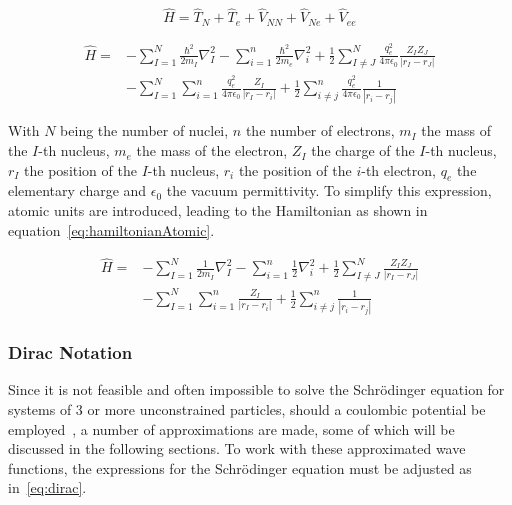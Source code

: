 \documentclass[11pt]{article}
\begin{document}
\begin{equation}
  \hat{H} = \hat{T}_N + \hat{T}_e + \hat{V}_{NN} + \hat{V}_{Ne} + \hat{V}_{ee}
  \label{eq:hamiltonian3}
\end{equation}

\begin{equation}
  \begin{aligned}
    \hat{H} = & -\sum_{I=1}^{N}\frac{\hbar^2}{2m_I}\nabla_I^2 -\sum_{i=1}^{n}\frac{\hbar^2}{2m_e}\nabla_i^2 + \frac{1}{2} \sum_{I\neq J}^{N} \frac{q_{e}^2}{4\pi \epsilon_0}\frac{Z_I Z_J}{|r_I - r_J|} \\
    & - \sum_{I=1}^{N}\sum_{i=1}^{n}\frac{q_{e}^2}{4\pi \epsilon_0}\frac{Z_I}{|r_I - r_i|} + \frac{1}{2}\sum_{i\neq j}^{n}\frac{q_{e}^2}{4\pi \epsilon_0}\frac{1}{|r_i - r_j|}
  \end{aligned}
  \label{eq:hamiltonian2}
\end{equation}

\bigskip

\noindent With $N$ being the number of nuclei, $n$ the number of electrons, $m_I$ the mass of the $I$-th nucleus, $m_e$ the mass of the electron, $Z_I$ the charge of the $I$-th nucleus, $r_I$ the position of the $I$-th nucleus, $r_i$ the position of the $i$-th electron, $q_e$ the elementary charge and $\epsilon_0$ the vacuum permittivity.
To simplify this expression, atomic units are introduced, leading to the Hamiltonian as shown in equation~\ref{eq:hamiltonianAtomic}.

\bigskip

\begin{equation}
  \begin{aligned}
    \hat{H} = & -\sum_{I=1}^{N}\frac{1}{2m_I}\nabla_I^2 -\sum_{i=1}^{n}\frac{1}{2}\nabla_i^2 + \frac{1}{2} \sum_{I\neq J}^{N} \frac{Z_I Z_J}{|r_I - r_J|} \\
    & - \sum_{I=1}^{N}\sum_{i=1}^{n}\frac{Z_I}{|r_I - r_i|} + \frac{1}{2}\sum_{i\neq j}^{n}\frac{1}{|r_i - r_j|}
  \end{aligned}
  \label{eq:hamiltonianAtomic}
\end{equation}

\bigskip

\subsubsection{Dirac Notation}
Since it is not feasible and often impossible to solve the Schrödinger equation for systems of 3 or more unconstrained particles, should a coulombic potential be employed~\cite{Toli2019}, a number of approximations are made, some of which will be discussed in the following sections. 
To work with these approximated wave functions, the expressions for the Schrödinger equation must be adjusted as in~\ref{eq:dirac}. 
\end{document}
